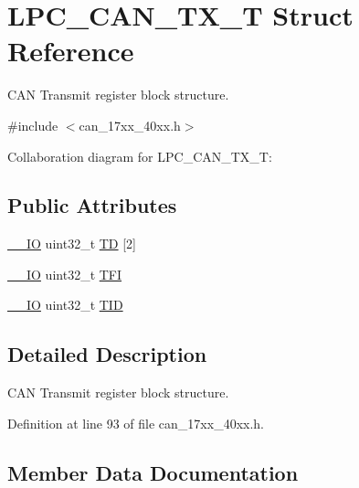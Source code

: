 \hypertarget{structLPC__CAN__TX__T}{}\section{L\+P\+C\+\_\+\+C\+A\+N\+\_\+\+T\+X\+\_\+T Struct Reference}
\label{structLPC__CAN__TX__T}


C\+AN Transmit register block structure.  




{\ttfamily \#include $<$can\+\_\+17xx\+\_\+40xx.\+h$>$}



Collaboration diagram for L\+P\+C\+\_\+\+C\+A\+N\+\_\+\+T\+X\+\_\+T\+:
\subsection*{Public Attributes}
\begin{DoxyCompactItemize}
\item 
\hyperlink{core__cm3_8h_aec43007d9998a0a0e01faede4133d6be}{\+\_\+\+\_\+\+IO} uint32\+\_\+t \hyperlink{structLPC__CAN__TX__T_ab41475b9f2b0952da4e71f74cfe33c20}{TD} \mbox{[}2\mbox{]}
\item 
\hyperlink{core__cm3_8h_aec43007d9998a0a0e01faede4133d6be}{\+\_\+\+\_\+\+IO} uint32\+\_\+t \hyperlink{structLPC__CAN__TX__T_a10a4c2076dd63148d4e9e4ad32af1451}{T\+FI}
\item 
\hyperlink{core__cm3_8h_aec43007d9998a0a0e01faede4133d6be}{\+\_\+\+\_\+\+IO} uint32\+\_\+t \hyperlink{structLPC__CAN__TX__T_a7a98a061fcb602592c5b6a17810a42c3}{T\+ID}
\end{DoxyCompactItemize}


\subsection{Detailed Description}
C\+AN Transmit register block structure. 

Definition at line 93 of file can\+\_\+17xx\+\_\+40xx.\+h.



\subsection{Member Data Documentation}
